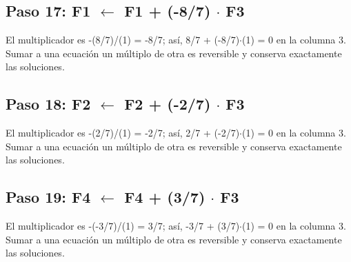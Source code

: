 \documentclass[conference]{IEEEtran}
\begin{document}
\medskip
\subsection*{Paso 17: F1 \(\leftarrow\) F1 + (-8/7) \(\cdot\) F3}
El multiplicador es -(8/7)/(1) = -8/7; así, 8/7 + (-8/7)\(\cdot\)(1) = 0 en la columna 3. Sumar a una ecuación un múltiplo de otra es reversible y conserva exactamente las soluciones.


\medskip
\subsection*{Paso 18: F2 \(\leftarrow\) F2 + (-2/7) \(\cdot\) F3}
El multiplicador es -(2/7)/(1) = -2/7; así, 2/7 + (-2/7)\(\cdot\)(1) = 0 en la columna 3. Sumar a una ecuación un múltiplo de otra es reversible y conserva exactamente las soluciones.


\medskip
\subsection*{Paso 19: F4 \(\leftarrow\) F4 + (3/7) \(\cdot\) F3}
El multiplicador es -(-3/7)/(1) = 3/7; así, -3/7 + (3/7)\(\cdot\)(1) = 0 en la columna 3. Sumar a una ecuación un múltiplo de otra es reversible y conserva exactamente las soluciones.
\end{document}

